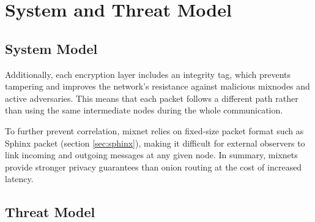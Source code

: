 \section{System and Threat Model}
\subsection{System Model}





Additionally, each encryption layer includes an integrity tag, which prevents tampering and improves the network’s resistance against malicious mixnodes and active adversaries.
This means that each packet follows a different path rather than using the same intermediate nodes during the whole communication.
 
To further prevent correlation, mixnet relies on fixed-size packet format such as Sphinx packet (section \ref{sec:sphinx}), making it difficult for external observers to link incoming and outgoing messages at any given node.
In summary, mixnets provide stronger privacy guarantees than onion routing at the cost of increased latency.


\subsection{Threat Model}
